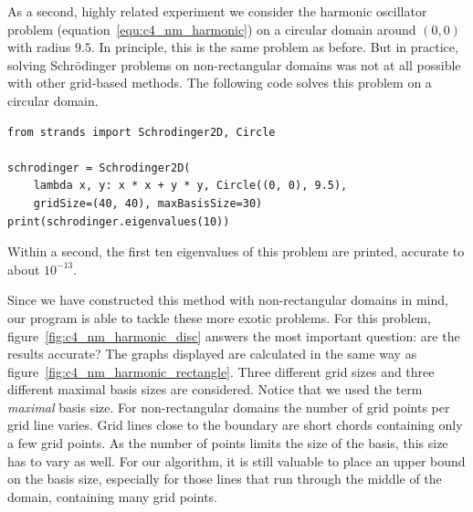 As a second, highly related experiment we consider the harmonic oscillator problem (equation~\eqref{equ:c4_nm_harmonic}) on a circular domain around $(0, 0)$ with radius $9.5$. In principle, this is the same problem as before. But in practice, solving Schrödinger problems on non-rectangular domains was not at all possible with other grid-based methods. The following code solves this problem on a circular domain.
\begin{verbatim}
from strands import Schrodinger2D, Circle

schrodinger = Schrodinger2D(
    lambda x, y: x * x + y * y, Circle((0, 0), 9.5),
    gridSize=(40, 40), maxBasisSize=30)
print(schrodinger.eigenvalues(10))
\end{verbatim}
Within a second, the first ten eigenvalues of this problem are printed, accurate to about $10^{-13}$.

Since we have constructed this method with non-rectangular domains in mind, our program is able to tackle these more exotic problems. For this problem, figure~\ref{fig:c4_nm_harmonic_disc} answers the most important question: are the results accurate? The graphs displayed are calculated in the same way as figure~\ref{fig:c4_nm_harmonic_rectangle}. Three different grid sizes and three different maximal basis sizes are considered. Notice that we used the term \emph{maximal} basis size. For non-rectangular domains the number of grid points per grid line varies. Grid lines close to the boundary are short chords containing only a few grid points. As the number of points limits the size of the basis, this size has to vary as well. For our algorithm, it is still valuable to place an upper bound on the basis size, especially for those lines that run through the middle of the domain, containing many grid points.

